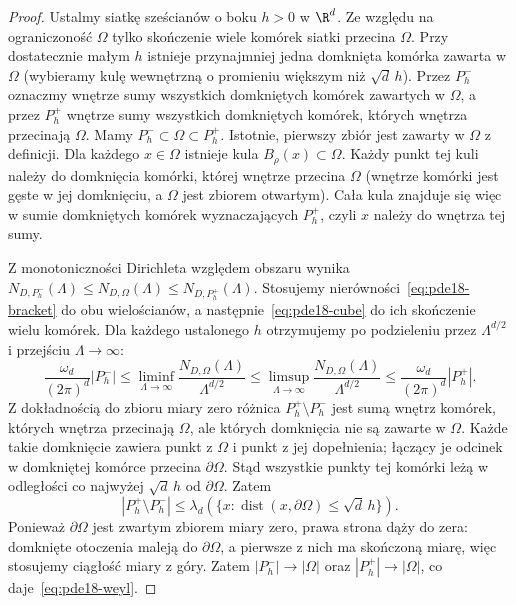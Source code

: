 \begin{proof}
Ustalmy siatkę sześcianów o boku $h>0$ w $\R^d$.
Ze względu na ograniczoność $\Omega$ tylko skończenie
wiele komórek siatki przecina $\Omega$. Przy dostatecznie
małym $h$ istnieje przynajmniej jedna domknięta komórka
zawarta w $\Omega$ (wybieramy kulę wewnętrzną
o promieniu większym niż $\sqrt d\,h$).
Przez $P_h^-$ oznaczmy wnętrze sumy wszystkich domkniętych
komórek zawartych w $\Omega$, a przez $P_h^+$ wnętrze sumy
wszystkich domkniętych komórek, których wnętrza przecinają
$\Omega$. Mamy $P_h^-\subset\Omega\subset P_h^+$.
Istotnie, pierwszy zbiór jest zawarty w $\Omega$
z definicji. Dla każdego $x\in\Omega$ istnieje kula
$B_\rho(x)\subset\Omega$. Każdy punkt tej kuli należy do
domknięcia komórki, której wnętrze przecina $\Omega$
(wnętrze komórki jest gęste w jej domknięciu,
a $\Omega$ jest zbiorem otwartym). Cała kula znajduje się więc
w sumie domkniętych komórek wyznaczających $P_h^+$,
czyli $x$ należy do wnętrza tej sumy.

Z monotoniczności Dirichleta względem obszaru wynika
$N_{D,P_h^-}(\Lambda)\le N_{D,\Omega}(\Lambda)
\le N_{D,P_h^+}(\Lambda)$.
Stosujemy nierówności~\eqref{eq:pde18-bracket} do obu
wielościanów, a następnie~\eqref{eq:pde18-cube} do ich
skończenie wielu komórek. Dla każdego ustalonego $h$
otrzymujemy po podzieleniu przez $\Lambda^{d/2}$ i
przejściu $\Lambda\to\infty$:
\[
 \frac{\omega_d}{(2\pi)^d}|P_h^-|
 \le\liminf_{\Lambda\to\infty}\frac{N_{D,\Omega}(\Lambda)}{\Lambda^{d/2}}
 \le\limsup_{\Lambda\to\infty}\frac{N_{D,\Omega}(\Lambda)}{\Lambda^{d/2}}
 \le\frac{\omega_d}{(2\pi)^d}|P_h^+|.
\]
Z dokładnością do zbioru miary zero różnica
$P_h^+\setminus P_h^-$ jest sumą wnętrz komórek,
których wnętrza przecinają $\Omega$, ale których
domknięcia nie są zawarte w $\Omega$. Każde takie
domknięcie zawiera punkt z $\Omega$ i punkt z jej
dopełnienia; łączący je odcinek w domkniętej komórce
przecina $\partial\Omega$. Stąd wszystkie punkty
tej komórki leżą w odległości co najwyżej $\sqrt d\,h$
od $\partial\Omega$. Zatem
\[
 |P_h^+\setminus P_h^-|
 \le\lambda_d(\{x:\operatorname{dist}(x,\partial\Omega)
 \le\sqrt d\,h\}).
\]
Ponieważ $\partial\Omega$ jest zwartym zbiorem miary zero,
prawa strona dąży do zera: domknięte otoczenia maleją
do $\partial\Omega$, a pierwsze z nich ma skończoną miarę,
więc stosujemy ciągłość miary z góry.
Zatem $|P_h^-|\to|\Omega|$ oraz
$|P_h^+|\to|\Omega|$, co daje~\eqref{eq:pde18-weyl}.


\end{proof}

